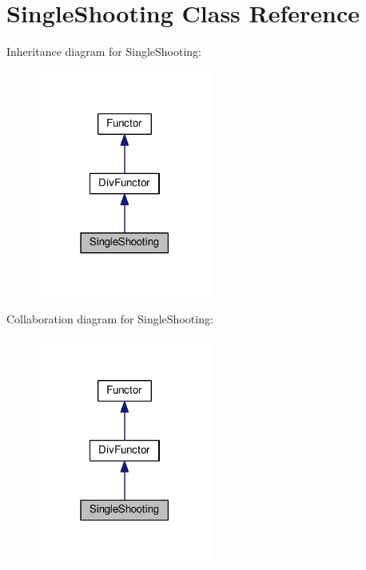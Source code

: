 \hypertarget{classSingleShooting}{}\section{Single\+Shooting Class Reference}
\label{classSingleShooting}


Inheritance diagram for Single\+Shooting\+:
\nopagebreak
\begin{figure}[H]
\begin{center}
\leavevmode
\includegraphics[width=162pt]{classSingleShooting__inherit__graph}
\end{center}
\end{figure}


Collaboration diagram for Single\+Shooting\+:
\nopagebreak
\begin{figure}[H]
\begin{center}
\leavevmode
\includegraphics[width=162pt]{classSingleShooting__coll__graph}
\end{center}
\end{figure}
